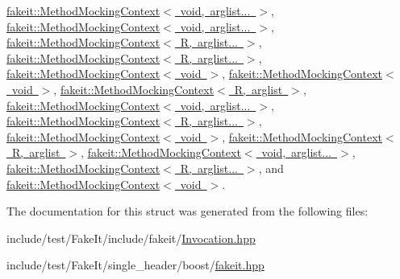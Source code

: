 \mbox{\hyperlink{classfakeit_1_1MethodMockingContext_a240fe9e15cffcebd52f5b0c9ccf87654}{fakeit\+::\+Method\+Mocking\+Context$<$ void, arglist... $>$}}, \mbox{\hyperlink{classfakeit_1_1MethodMockingContext_a240fe9e15cffcebd52f5b0c9ccf87654}{fakeit\+::\+Method\+Mocking\+Context$<$ void, arglist... $>$}}, \mbox{\hyperlink{classfakeit_1_1MethodMockingContext_a240fe9e15cffcebd52f5b0c9ccf87654}{fakeit\+::\+Method\+Mocking\+Context$<$ R, arglist... $>$}}, \mbox{\hyperlink{classfakeit_1_1MethodMockingContext_a240fe9e15cffcebd52f5b0c9ccf87654}{fakeit\+::\+Method\+Mocking\+Context$<$ R, arglist... $>$}}, \mbox{\hyperlink{classfakeit_1_1MethodMockingContext_a240fe9e15cffcebd52f5b0c9ccf87654}{fakeit\+::\+Method\+Mocking\+Context$<$ void $>$}}, \mbox{\hyperlink{classfakeit_1_1MethodMockingContext_a240fe9e15cffcebd52f5b0c9ccf87654}{fakeit\+::\+Method\+Mocking\+Context$<$ void $>$}}, \mbox{\hyperlink{classfakeit_1_1MethodMockingContext_a240fe9e15cffcebd52f5b0c9ccf87654}{fakeit\+::\+Method\+Mocking\+Context$<$ R, arglist $>$}}, \mbox{\hyperlink{classfakeit_1_1MethodMockingContext_a240fe9e15cffcebd52f5b0c9ccf87654}{fakeit\+::\+Method\+Mocking\+Context$<$ void, arglist... $>$}}, \mbox{\hyperlink{classfakeit_1_1MethodMockingContext_a240fe9e15cffcebd52f5b0c9ccf87654}{fakeit\+::\+Method\+Mocking\+Context$<$ R, arglist... $>$}}, \mbox{\hyperlink{classfakeit_1_1MethodMockingContext_a240fe9e15cffcebd52f5b0c9ccf87654}{fakeit\+::\+Method\+Mocking\+Context$<$ void $>$}}, \mbox{\hyperlink{classfakeit_1_1MethodMockingContext_a240fe9e15cffcebd52f5b0c9ccf87654}{fakeit\+::\+Method\+Mocking\+Context$<$ R, arglist $>$}}, \mbox{\hyperlink{classfakeit_1_1MethodMockingContext_a240fe9e15cffcebd52f5b0c9ccf87654}{fakeit\+::\+Method\+Mocking\+Context$<$ void, arglist... $>$}}, \mbox{\hyperlink{classfakeit_1_1MethodMockingContext_a240fe9e15cffcebd52f5b0c9ccf87654}{fakeit\+::\+Method\+Mocking\+Context$<$ R, arglist... $>$}}, and \mbox{\hyperlink{classfakeit_1_1MethodMockingContext_a240fe9e15cffcebd52f5b0c9ccf87654}{fakeit\+::\+Method\+Mocking\+Context$<$ void $>$}}.



The documentation for this struct was generated from the following files\+:\begin{DoxyCompactItemize}
\item 
include/test/\+Fake\+It/include/fakeit/\mbox{\hyperlink{Invocation_8hpp}{Invocation.\+hpp}}\item 
include/test/\+Fake\+It/single\+\_\+header/boost/\mbox{\hyperlink{single__header_2boost_2fakeit_8hpp}{fakeit.\+hpp}}\end{DoxyCompactItemize}
